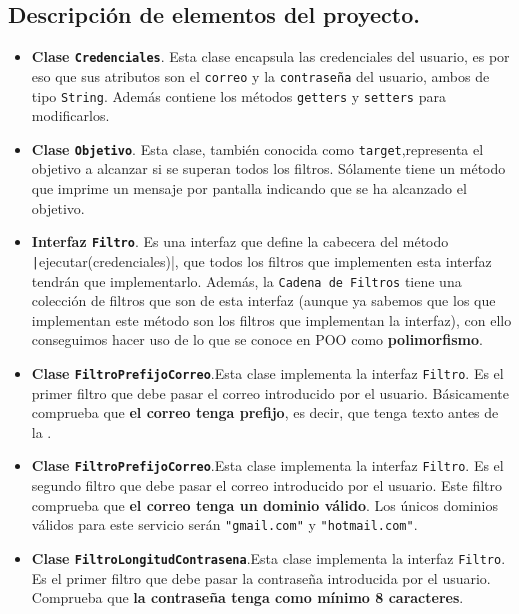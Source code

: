 \documentclass[a4paper,12pt]{article}
\begin{document}
		\subsection{Descripción de elementos del proyecto.}
			\begin{itemize}
				\item \textbf{Clase \texttt{Credenciales}}. Esta clase encapsula las credenciales del usuario, es por eso que sus atributos son el \texttt{correo} y la \texttt{contraseña} del usuario, ambos de tipo \texttt{String}. Además contiene los métodos \texttt{getters} y \texttt{setters} para modificarlos.
				
				\item \textbf{Clase \texttt{Objetivo}}. Esta clase, también conocida como \texttt{target},representa el objetivo a alcanzar si se superan todos los filtros. Sólamente tiene un método que imprime un mensaje por pantalla indicando que se ha alcanzado el objetivo.
				
				\item \textbf{Interfaz \texttt{Filtro}}. Es una interfaz que define la cabecera del método \texttt|ejecutar(credenciales)|, que todos los filtros que implementen esta interfaz tendrán que implementarlo. Además, la \texttt{Cadena de Filtros} tiene una colección de filtros que son de esta interfaz (aunque ya sabemos que los que implementan este método son los filtros que implementan la interfaz), con ello conseguimos hacer uso de lo que se conoce en POO como \textbf{polimorfismo}.
				
				\item \textbf{Clase \texttt{FiltroPrefijoCorreo}}.Esta clase implementa la interfaz \texttt{Filtro}.  Es el primer filtro que debe pasar el correo introducido por el usuario. Básicamente comprueba que\textbf{ el correo tenga prefijo}, es decir, que tenga texto antes de la \texttt{\@}.
				
				\item \textbf{Clase \texttt{FiltroPrefijoCorreo}}.Esta clase implementa la interfaz \texttt{Filtro}.  Es el segundo filtro que debe pasar el correo introducido por el usuario. Este filtro  comprueba que \textbf{el correo tenga un dominio válido}. Los únicos dominios válidos para este servicio serán \texttt{"gmail.com"} y \texttt{"hotmail.com"}.
				
				\item \textbf{Clase \texttt{FiltroLongitudContrasena}}.Esta clase implementa la interfaz \texttt{Filtro}.  Es el primer filtro que debe pasar la contraseña introducida por el usuario. Comprueba que \textbf{la contraseña tenga como mínimo 8 caracteres}.  
				

\end{itemize}
\end{document}
